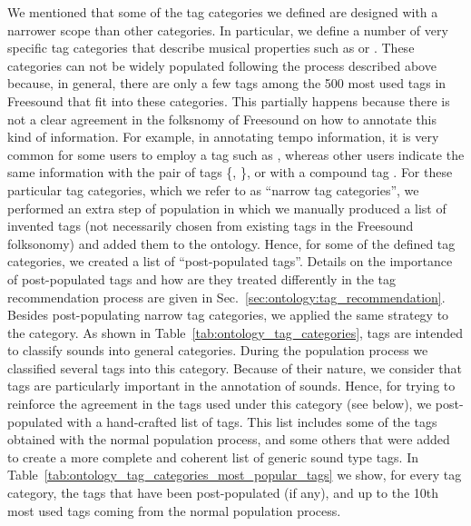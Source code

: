 We mentioned that some of the tag categories we defined are designed with a narrower scope than other categories.
In particular, we define a number of very specific tag categories that describe musical properties such as  or .
These categories can not be widely populated following the process described above because, in general, there are only a few tags among the 500 most used tags in Freesound that fit into these categories. This partially happens because there is not a clear agreement in the folksnomy of Freesound on how to annotate this kind of information. For example, in annotating tempo information, it is very common for some users to employ a tag such as , whereas other users indicate the same information with the pair of tags \{, \}, or with a compound tag .
For these particular tag categories, which we refer to as ``narrow tag categories'', we performed an extra step of population in which we manually produced a list of invented tags (not necessarily chosen from existing tags in the Freesound folksonomy) and added them to the ontology. Hence, for some of the defined tag categories, we created a list of ``post-populated tags''.
Details on the importance of post-populated tags and how are they treated differently in the tag recommendation process are given in Sec.~\ref{sec:ontology:tag_recommendation}.
Besides post-populating narrow tag categories, we applied the same strategy to the  category. 
As shown in Table~\ref{tab:ontology_tag_categories},  tags are intended to classify sounds into general categories. During the population process we classified several tags into this category.
Because of their nature, we consider that  tags are particularly important in the annotation of sounds. Hence, for trying to reinforce the agreement in the tags used under this category (see below), we post-populated  with a hand-crafted list of tags. This list includes some of the tags obtained with the normal population process, and some others that were added to create a more complete and coherent list of generic sound type tags.
In Table~\ref{tab:ontology_tag_categories_most_popular_tags} we show, for every tag category, the tags that have been post-populated (if any), and up to the 10th most used tags coming from the normal population process.

